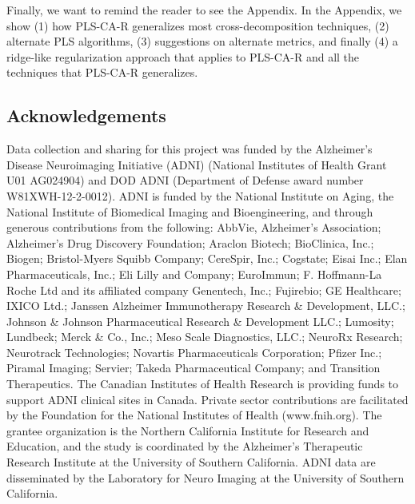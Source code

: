 \documentclass[12pt]{article}
\begin{document}
Finally, we want to remind the reader to see the Appendix. In the
Appendix, we show (1) how PLS-CA-R generalizes most cross-decomposition
techniques, (2) alternate PLS algorithms, (3) suggestions on alternate
metrics, and finally (4) a ridge-like regularization approach that
applies to PLS-CA-R and all the techniques that PLS-CA-R generalizes.

\hypertarget{acknowledgements}{%
\subsection{Acknowledgements}\label{acknowledgements}}

Data collection and sharing for this project was funded by the
Alzheimer's Disease Neuroimaging Initiative (ADNI) (National Institutes
of Health Grant U01 AG024904) and DOD ADNI (Department of Defense award
number W81XWH-12-2-0012). ADNI is funded by the National Institute on
Aging, the National Institute of Biomedical Imaging and Bioengineering,
and through generous contributions from the following: AbbVie,
Alzheimer's Association; Alzheimer's Drug Discovery Foundation; Araclon
Biotech; BioClinica, Inc.; Biogen; Bristol-Myers Squibb Company;
CereSpir, Inc.; Cogstate; Eisai Inc.; Elan Pharmaceuticals, Inc.; Eli
Lilly and Company; EuroImmun; F. Hoffmann-La Roche Ltd and its
affiliated company Genentech, Inc.; Fujirebio; GE Healthcare; IXICO
Ltd.; Janssen Alzheimer Immunotherapy Research \& Development, LLC.;
Johnson \& Johnson Pharmaceutical Research \& Development LLC.;
Lumosity; Lundbeck; Merck \& Co., Inc.; Meso Scale Diagnostics, LLC.;
NeuroRx Research; Neurotrack Technologies; Novartis Pharmaceuticals
Corporation; Pfizer Inc.; Piramal Imaging; Servier; Takeda
Pharmaceutical Company; and Transition Therapeutics. The Canadian
Institutes of Health Research is providing funds to support ADNI
clinical sites in Canada. Private sector contributions are facilitated
by the Foundation for the National Institutes of Health (www.fnih.org).
The grantee organization is the Northern California Institute for
Research and Education, and the study is coordinated by the Alzheimer's
Therapeutic Research Institute at the University of Southern California.
ADNI data are disseminated by the Laboratory for Neuro Imaging at the
University of Southern California.



\end{document}
